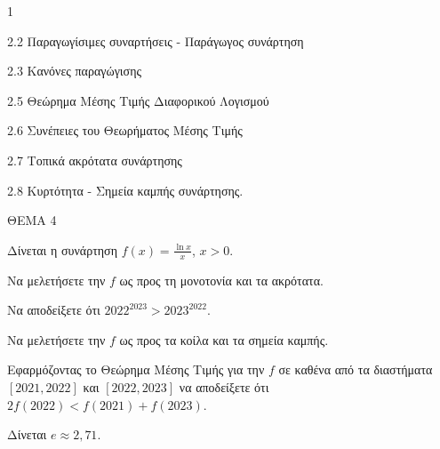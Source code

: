 \begin{ylh}{1}
    \item 2.2 Παραγωγίσιμες συναρτήσεις - Παράγωγος συνάρτηση
    \item 2.3 Κανόνες παραγώγισης
    \item 2.5 Θεώρημα Μέσης Τιμής Διαφορικού Λογισμού
    \item 2.6 Συνέπειες του Θεωρήματος Μέσης Τιμής
    \item 2.7 Τοπικά ακρότατα συνάρτησης
    \item 2.8 Κυρτότητα - Σημεία καμπής συνάρτησης.
\end{ylh}
ΘΕΜΑ 4

Δίνεται η συνάρτηση $f(x)=\frac{\ln x}{x}$, $x>0$.
\begin{alist}
\item Να μελετήσετε την $f$ ως προς τη μονοτονία και τα ακρότατα. 
\item Να αποδείξετε ότι $2022^{2023} > 2023^{2022}$. 
\item Να μελετήσετε την $f$ ως προς τα κοίλα και τα σημεία καμπής. 
\item Εφαρμόζοντας το Θεώρημα Μέσης Τιμής για την $f$ σε καθένα από τα διαστήματα $[2021,2022]$ και $[2022,2023]$ να αποδείξετε ότι $2f(2022) < f(2021) + f(2023)$. 
\end{alist}
Δίνεται $e \approx 2,71$.